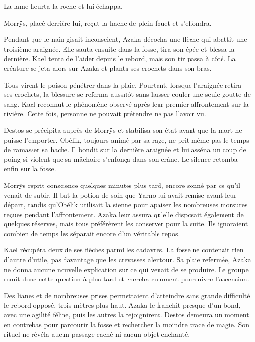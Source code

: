 La lame heurta la roche et lui échappa.

Morrÿs, placé derrière lui, reçut la hache de plein fouet et s'effondra.

Pendant que le nain gisait inconscient, Azaka décocha une flèche qui abattit une troisième araignée. Elle sauta ensuite dans la fosse, tira son épée et blessa la dernière. Kael tenta de l'aider depuis le rebord, mais son tir passa à côté. La créature se jeta alors sur Azaka et planta ses crochets dans son bras.

Tous virent le poison pénétrer dans la plaie. Pourtant, lorsque l'araignée retira ses crochets, la blessure se referma aussitôt sans laisser couler une seule goutte de sang. Kael reconnut le phénomène observé après leur premier affrontement sur la rivière. Cette fois, personne ne pouvait prétendre ne pas l'avoir vu.

Destos se précipita auprès de Morrÿs et stabilisa son état avant que la mort ne puisse l'emporter. Obélik, toujours animé par sa rage, ne prit même pas le temps de ramasser sa hache. Il bondit sur la dernière araignée et lui asséna un coup de poing si violent que sa mâchoire s'enfonça dans son crâne. Le silence retomba enfin sur la fosse.

\scenebreak

Morrÿs reprit conscience quelques minutes plus tard, encore sonné par ce qu'il venait de subir. Il but la potion de soin que Yarno lui avait remise avant leur départ, tandis qu'Obélik utilisait la sienne pour apaiser les nombreuses morsures reçues pendant l'affrontement. Azaka leur assura qu'elle disposait également de quelques réserves, mais tous préférèrent les conserver pour la suite. Ils ignoraient combien de temps les séparait encore d'un véritable repos.

Kael récupéra deux de ses flèches parmi les cadavres. La fosse ne contenait rien d'autre d'utile, pas davantage que les crevasses alentour. Sa plaie refermée, Azaka ne donna aucune nouvelle explication sur ce qui venait de se produire. Le groupe remit donc cette question à plus tard et chercha comment poursuivre l'ascension.

Des lianes et de nombreuses prises permettaient d'atteindre sans grande difficulté le rebord opposé, trois mètres plus haut. Azaka le franchit presque d'un bond, avec une agilité féline, puis les autres la rejoignirent. Destos demeura un moment en contrebas pour parcourir la fosse et rechercher la moindre trace de magie. Son rituel ne révéla aucun passage caché ni aucun objet enchanté.

